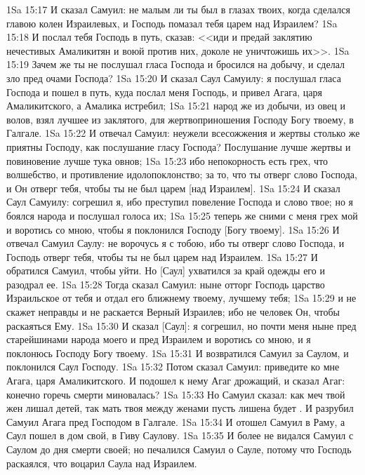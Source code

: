 \vs 1Sa 15:17 И сказал Самуил: не малым ли ты был в глазах твоих, когда сделался главою колен Израилевых, и Господь помазал тебя царем над Израилем?
\vs 1Sa 15:18 И послал тебя Господь в путь, сказав: <<иди и предай заклятию нечестивых Амаликитян и воюй против них, доколе не уничтожишь их>>.
\vs 1Sa 15:19 Зачем же ты не послушал гласа Господа и бросился на добычу, и сделал зло пред очами Господа?
\vs 1Sa 15:20 И сказал Саул Самуилу: я послушал гласа Господа и пошел в путь, куда послал меня Господь, и привел Агага, царя Амаликитского, а Амалика истребил;
\vs 1Sa 15:21 народ же из добычи, из овец и волов, взял лучшее из заклятого, для жертвоприношения Господу Богу твоему, в Галгале.
\vs 1Sa 15:22 И отвечал Самуил: неужели всесожжения и жертвы столько же приятны Господу, как послушание гласу Господа? Послушание лучше жертвы и повиновение лучше тука овнов;
\vs 1Sa 15:23 ибо непокорность есть  грех, что волшебство, и противление  идолопоклонство; за то, что ты отверг слово Господа, и Он отверг тебя, чтобы ты не был царем [над Израилем].
\vs 1Sa 15:24 И сказал Саул Самуилу: согрешил я, ибо преступил повеление Господа и слово твое; но я боялся народа и послушал голоса их;
\vs 1Sa 15:25 теперь же сними с меня грех мой и воротись со мною, чтобы я поклонился Господу [Богу твоему].
\vs 1Sa 15:26 И отвечал Самуил Саулу: не ворочусь я с тобою, ибо ты отверг слово Господа, и Господь отверг тебя, чтобы ты не был царем над Израилем.
\vs 1Sa 15:27 И обратился Самуил, чтобы уйти. Но [Саул] ухватился за край одежды его и разодрал ее.
\vs 1Sa 15:28 Тогда сказал Самуил: ныне отторг Господь царство Израильское от тебя и отдал его ближнему твоему, лучшему тебя;
\vs 1Sa 15:29 и не скажет неправды и не раскается Верный Израилев; ибо не человек Он, чтобы раскаяться Ему.
\vs 1Sa 15:30 И сказал [Саул]: я согрешил, но почти меня ныне пред старейшинами народа моего и пред Израилем и воротись со мною, и я поклонюсь Господу Богу твоему.
\vs 1Sa 15:31 И возвратился Самуил за Саулом, и поклонился Саул Господу.
\vs 1Sa 15:32 Потом сказал Самуил: приведите ко мне Агага, царя Амаликитского. И подошел к нему Агаг дрожащий, и сказал Агаг: конечно горечь смерти миновалась?
\vs 1Sa 15:33 Но Самуил сказал: как меч твой жен лишал детей, так мать твоя между женами пусть лишена будет . И разрубил Самуил Агага пред Господом в Галгале.
\vs 1Sa 15:34 И отошел Самуил в Раму, а Саул пошел в дом свой, в Гиву Саулову.
\vs 1Sa 15:35 И более не видался Самуил с Саулом до дня смерти своей; но печалился Самуил о Сауле, потому что Господь раскаялся, что воцарил Саула над Израилем.
